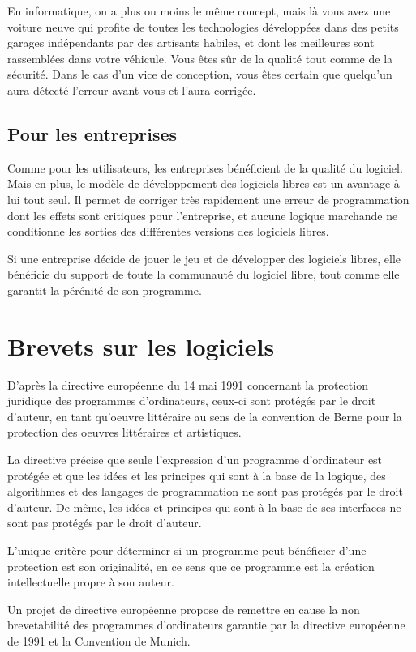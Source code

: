 \documentclass{article}
\begin{document}
En informatique, on a plus ou moins le même concept, mais là vous avez une voiture neuve qui profite de toutes les technologies développées dans des petits garages indépendants par des artisants habiles, et dont les meilleures sont rassemblées dans votre véhicule. Vous êtes sûr de la qualité tout comme de la sécurité. Dans le cas d'un vice de conception, vous êtes certain que quelqu'un aura détecté l'erreur avant vous et l'aura corrigée.
\subsection{Pour les entreprises}

Comme pour les utilisateurs, les entreprises bénéficient de la qualité du logiciel. Mais en plus, le modèle de développement des logiciels libres est un avantage à lui tout seul. Il permet de corriger très rapidement une erreur de programmation dont les effets sont critiques pour l'entreprise, et aucune logique marchande ne conditionne les sorties des différentes versions des logiciels libres.

Si une entreprise décide de jouer le jeu et de développer des logiciels libres, elle bénéficie du support de toute la communauté du logiciel libre, tout comme elle garantit la pérénité de son programme.
\section{Brevets sur les logiciels}

D'après la directive européenne du 14 mai 1991 concernant la protection juridique des programmes d'ordinateurs, ceux-ci sont protégés par le droit d'auteur, en tant qu'oeuvre littéraire au sens de la convention de Berne pour la protection des oeuvres littéraires et artistiques.

La directive précise que seule l'expression d'un programme d'ordinateur est protégée et que les idées et les principes qui sont à la base de la logique, des algorithmes et des langages de programmation ne sont pas protégés par le droit d'auteur. De même, les idées et principes qui sont à la base de ses interfaces ne sont pas protégés par le droit d'auteur.

L'unique critère pour déterminer si un programme peut bénéficier d'une protection est son originalité, en ce sens que ce programme est la création intellectuelle propre à son auteur.

Un projet de directive européenne propose de remettre en cause la non brevetabilité des programmes d'ordinateurs garantie par la directive européenne de 1991 et la Convention de Munich.
\end{document}
